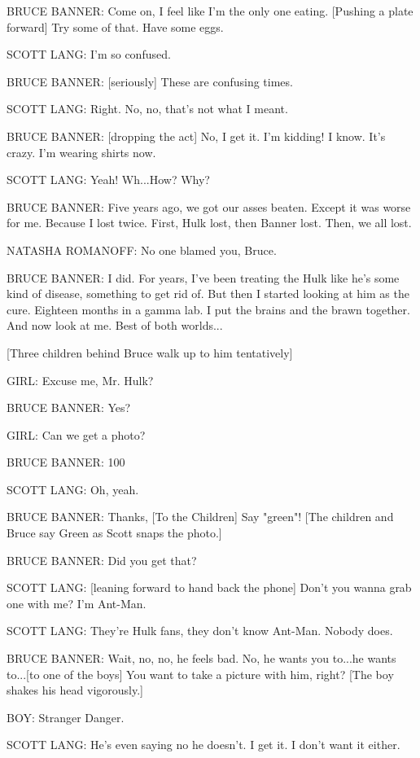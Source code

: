 BRUCE BANNER: Come on, I feel like I'm the only one eating. [Pushing a plate forward] Try some of that. Have some eggs.

SCOTT LANG: I'm so confused.

BRUCE BANNER: [seriously] These are confusing times.

SCOTT LANG: Right. No, no, that's not what I meant.

BRUCE BANNER: [dropping the act] No, I get it. I'm kidding! I know. It's crazy. I'm wearing shirts now.

SCOTT LANG: Yeah! Wh...How? Why?

BRUCE BANNER: Five years ago, we got our asses beaten. Except it was worse for me. Because I lost twice. First, Hulk lost, then Banner lost. Then, we all lost.

NATASHA ROMANOFF: No one blamed you, Bruce.

BRUCE BANNER: I did. For years, I've been treating the Hulk like he's some kind of disease, something to get rid of. But then I started looking at him as the cure. Eighteen months in a gamma lab. I put the brains and the brawn together. And now look at me. Best of both worlds...

[Three children behind Bruce walk up to him tentatively]

GIRL: Excuse me, Mr. Hulk?

BRUCE BANNER: Yes?

GIRL: Can we get a photo?

BRUCE BANNER: 100%

SCOTT LANG: Oh, yeah.

BRUCE BANNER: Thanks, [To the Children] Say "green"! [The children and Bruce say Green as Scott snaps the photo.]

BRUCE BANNER: Did you get that?

SCOTT LANG: [leaning forward to hand back the phone] Don't you wanna grab one with me? I'm Ant-Man.

SCOTT LANG: They're Hulk fans, they don't know Ant-Man. Nobody does.

BRUCE BANNER: Wait, no, no, he feels bad. No, he wants you to...he wants to...[to one of the boys] You want to take a picture with him, right? [The boy shakes his head vigorously.]

BOY: Stranger Danger.

SCOTT LANG: He's even saying no he doesn't. I get it. I don't want it either.

